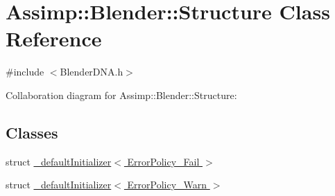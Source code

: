\hypertarget{class_assimp_1_1_blender_1_1_structure}{\section{Assimp\+:\+:Blender\+:\+:Structure Class Reference}
\label{class_assimp_1_1_blender_1_1_structure}
}


{\ttfamily \#include $<$Blender\+D\+N\+A.\+h$>$}



Collaboration diagram for Assimp\+:\+:Blender\+:\+:Structure\+:
\subsection*{Classes}
\begin{DoxyCompactItemize}
\item 
struct \hyperlink{struct_assimp_1_1_blender_1_1_structure_1_1__default_initializer_3_01_error_policy___fail_01_4}{\+\_\+default\+Initializer$<$ Error\+Policy\+\_\+\+Fail $>$}
\item 
struct \hyperlink{struct_assimp_1_1_blender_1_1_structure_1_1__default_initializer_3_01_error_policy___warn_01_4}{\+\_\+default\+Initializer$<$ Error\+Policy\+\_\+\+Warn $>$}
\end{DoxyCompactItemize}
